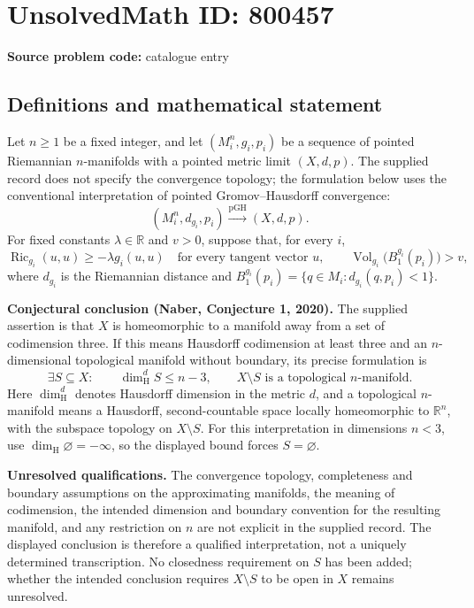 \documentclass[11pt]{article}
\newcommand{\R}{\mathbb{R}}
\begin{document}
\section*{UnsolvedMath ID: 800457}
\textbf{Source problem code:} catalogue entry
\subsection{Definitions and mathematical statement}
Let \(n\geq 1\) be a fixed integer, and let \((M_i^n,g_i,p_i)\) be a sequence of pointed Riemannian \(n\)-manifolds with a pointed metric limit \((X,d,p)\). The supplied record does not specify the convergence topology; the formulation below uses the conventional interpretation of pointed Gromov--Hausdorff convergence:
\[
(M_i^n,d_{g_i},p_i)\xrightarrow{\mathrm{pGH}}(X,d,p).
\]
For fixed constants \(\lambda\in\R\) and \(v>0\), suppose that, for every \(i\),
\[
\operatorname{Ric}_{g_i}(u,u)\geq-\lambda g_i(u,u)
\quad\text{for every tangent vector }u,
\qquad
\operatorname{Vol}_{g_i}\bigl(B_1^{g_i}(p_i)\bigr)>v,
\]
where \(d_{g_i}\) is the Riemannian distance and \(B_1^{g_i}(p_i)=\{q\in M_i:d_{g_i}(q,p_i)<1\}\).

\textbf{Conjectural conclusion (Naber, Conjecture 1, 2020).} The supplied assertion is that \(X\) is homeomorphic to a manifold away from a set of codimension three. If this means Hausdorff codimension at least three and an \(n\)-dimensional topological manifold without boundary, its precise formulation is
\[
\exists S\subseteq X:\qquad
\dim_{\mathrm H}^{d}S\leq n-3,
\qquad
X\setminus S\text{ is a topological }n\text{-manifold}.
\]
Here \(\dim_{\mathrm H}^{d}\) denotes Hausdorff dimension in the metric \(d\), and a topological \(n\)-manifold means a Hausdorff, second-countable space locally homeomorphic to \(\R^n\), with the subspace topology on \(X\setminus S\). For this interpretation in dimensions \(n<3\), use \(\dim_{\mathrm H}\varnothing=-\infty\), so the displayed bound forces \(S=\varnothing\).

\textbf{Unresolved qualifications.} The convergence topology, completeness and boundary assumptions on the approximating manifolds, the meaning of codimension, the intended dimension and boundary convention for the resulting manifold, and any restriction on \(n\) are not explicit in the supplied record. The displayed conclusion is therefore a qualified interpretation, not a uniquely determined transcription. No closedness requirement on \(S\) has been added; whether the intended conclusion requires \(X\setminus S\) to be open in \(X\) remains unresolved.
\end{document}
